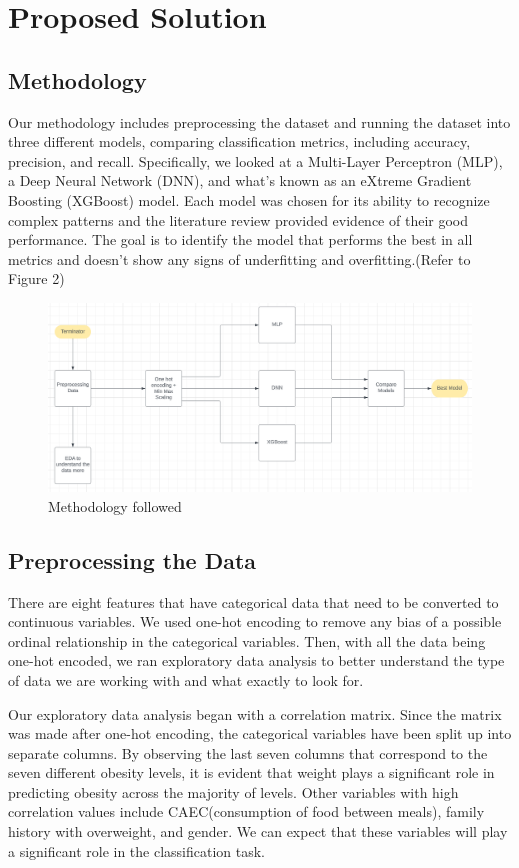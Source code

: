 \documentclass[11pt]{article}
\begin{document}
\section{Proposed Solution}
    \subsection{Methodology}
    Our methodology includes preprocessing the dataset and running the dataset into three different models, comparing classification metrics, including accuracy, precision, and recall. Specifically, we looked at a Multi-Layer Perceptron (MLP), a Deep Neural Network (DNN), and what's known as an eXtreme Gradient Boosting (XGBoost) model. Each model was chosen for its ability to recognize complex patterns and the literature review provided evidence of their good performance. The goal is to identify the model that performs the best in all metrics and doesn’t show any signs of underfitting and overfitting.(Refer to Figure 2)
    \begin{figure}[h]
        \centering
        \includegraphics[width=0.9\linewidth]{method.png}
        \caption{Methodology followed}
        \label{fig:enter-label}
    \end{figure}
    \subsection{Preprocessing the Data}
    There are eight features that have categorical data that need to be converted to continuous variables. We used one-hot encoding to remove any bias of a possible ordinal relationship in the categorical variables. Then, with all the data being one-hot encoded, we ran exploratory data analysis to better understand the type of data we are working with and what exactly to look for. 
    
    Our exploratory data analysis began with a correlation matrix. Since the matrix was made after one-hot encoding, the categorical variables have been split up into separate columns. By observing the last seven columns that correspond to the seven different obesity levels, it is evident that weight plays a significant role in predicting obesity across the majority of levels. Other variables with high correlation values include CAEC(consumption of food between meals), family history with overweight, and gender. We can expect that these variables will play a significant role in the classification task. 
\end{document}
